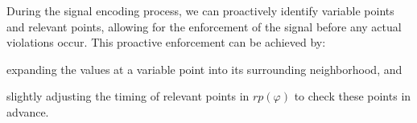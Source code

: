     \begin{remark}
        During the signal encoding process, we can proactively identify variable points and relevant points, allowing for the enforcement of the signal before any actual violations occur. This proactive enforcement can be achieved by:
        \begin{enumerate*}[label=(\roman*)]
            \item expanding the values at a variable point into its surrounding neighborhood, and
            \item slightly adjusting the timing of relevant points in $rp(\varphi)$ to check these points in advance.
        \end{enumerate*}
    \end{remark}

    
    
    
